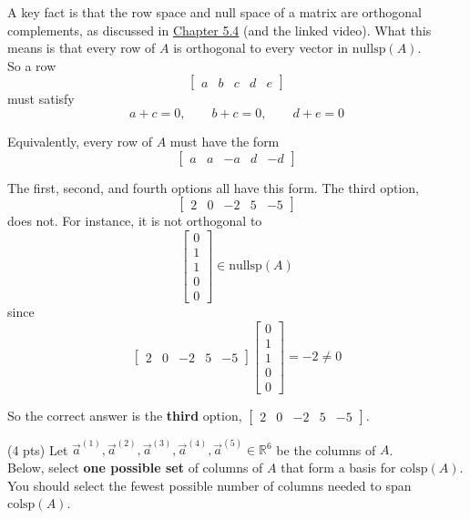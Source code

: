 \documentclass[11pt]{article}
\begin{document}
\begin{prob}
\begin{subprob}
\begin{solution}
A key fact is that the row space and null space of a matrix are orthogonal complements, as discussed in \href{https://notes.eecs245.org/matrices/null-space-rank-nullity/\#example-orthogonal-complements}{Chapter 5.4} (and the linked video). What this means is that every row of $A$ is orthogonal to every vector in $\text{nullsp}(A)$. \\

So a row
\[
\begin{bmatrix} a & b & c & d & e \end{bmatrix}
\]
must satisfy
\[
a+c = 0,
\qquad
b+c = 0,
\qquad
d+e = 0
\]

Equivalently, every row of $A$ must have the form
\[
\begin{bmatrix} a & a & -a & d & -d \end{bmatrix}
\]

The first, second, and fourth options all have this form. The third option,
\[
\begin{bmatrix} 2 & 0 & -2 & 5 & -5 \end{bmatrix}
\]
does not. For instance, it is not orthogonal to
\[
\begin{bmatrix}0\\1\\1\\0\\0\end{bmatrix}
\in \text{nullsp}(A)
\]
since
\[
\begin{bmatrix} 2 & 0 & -2 & 5 & -5 \end{bmatrix}
\begin{bmatrix}0\\1\\1\\0\\0\end{bmatrix}
= -2 \neq 0
\]

So the correct answer is the \textbf{third} option, $\boxed{\begin{bmatrix} 2 & 0 & -2 & 5 & -5 \end{bmatrix}}$.
\end{solution}
\end{subprob}

\begin{subprob}(4 pts) Let $\vec a^{(1)}, \vec a^{(2)}, \vec a^{(3)}, \vec a^{(4)}, \vec a^{(5)} \in \mathbb{R}^6$ be the columns of $A$. \\

Below, select \textbf{one possible set} of columns of $A$ that form a basis for $\text{colsp}(A)$.
You should select the fewest possible number of columns needed to span $\text{colsp}(A)$.


\end{subprob}
\end{prob}
\end{document}
